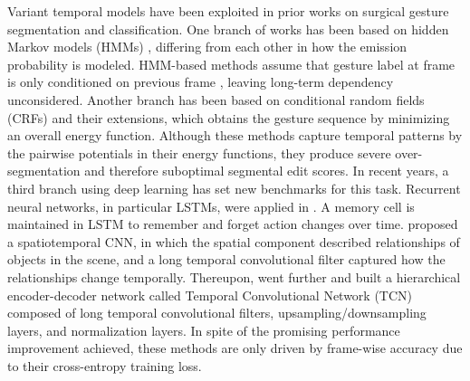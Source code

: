 \documentclass{llncs}
\begin{document}
Variant temporal models have been exploited in prior works on surgical gesture segmentation and classification. One branch of works has been based on hidden Markov models (HMMs) \cite{tao2012sparse,sefati2015learning,varadarajan2009data}, differing from each other in how the emission probability is modeled. HMM-based methods assume that gesture label at frame  is only conditioned on previous frame , leaving long-term dependency unconsidered. Another branch has been based on conditional random fields (CRFs) \cite{tao2013surgical,lea2015improved,lea2016learning} and their extensions, which obtains the gesture sequence by minimizing an overall energy function. Although these methods capture temporal patterns by the pairwise potentials in their energy functions, they produce severe over-segmentation and therefore suboptimal segmental edit scores. In recent years, a third branch using deep learning has set new benchmarks for this task. Recurrent neural networks, in particular LSTMs, were applied in \cite{dipietro2016recognizing}. A memory cell is maintained in LSTM to remember and forget action changes over time. \cite{lea2016segmental} proposed a spatiotemporal CNN, in which the spatial component described relationships of objects in the scene, and a long temporal convolutional filter captured how the relationships change temporally. Thereupon, \cite{Lea_2017_CVPR,lea2016temporal} went further and built a hierarchical encoder-decoder network called Temporal Convolutional Network (TCN) composed of long temporal convolutional filters, upsampling/downsampling layers, and normalization layers. In spite of the promising performance improvement achieved, these methods are only driven by frame-wise accuracy due to their cross-entropy training loss.
\end{document}
